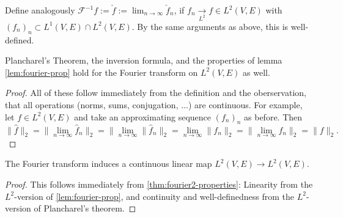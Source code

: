 \begin{definition}
  \label{def:invFourier-L2}
  \lean{}
  Define analogously $\mathcal F^{-1}f:=\check f:=\lim_{n\to\infty}\check f_n$, if $f_n\xrightarrow[L^2]{}f\in L^2(V,E)$
  with $(f_n)_n\subset L^1(V,E)\cap L^2(V,E)$. By the same arguments as above, this is well-defined.
\end{definition}

\begin{corollary}
  \label{thm:fourier2-properties}
  \lean{}
  Plancharel's Theorem, the inversion formula, and the properties of lemma \ref{lem:fourier-prop} hold
  for the Fourier transform on $L^2(V,E)$ as well.
\end{corollary}
\begin{proof}
  All of these follow immediately from the definition and the oberservation, that all operations (norms, sums, conjugation, $\ldots$) are continuous.
  For example, let $f\in L^2(V,E)$ and take an approximating sequence $(f_n)_n$ as before. Then
  $$\|\widehat f\|_2=\|\lim_{n\to\infty}\widehat f_n\|_2=\|\lim_{n\to\infty}\|\widehat f_n\|_2=\lim_{n\to\infty}\|f_n\|_2
  =\|\lim_{n\to\infty}f_n\|_2=\|f\|_2.$$
\end{proof}

\begin{corollary}
  \label{thm:fourier-is-l2-linear}
  \leanok %
  The Fourier transform induces a continuous linear map $L^2(V,E) \to L^2(V,E)$.
  \end{corollary}
  \begin{proof}
    This follows immediately from \ref{thm:fourier2-properties}: Linearity from the $L^2$-version of
    \ref{lem:fourier-prop}, and continuity and well-definedness from the $L^2$-version of Plancharel's theorem.
\end{proof}